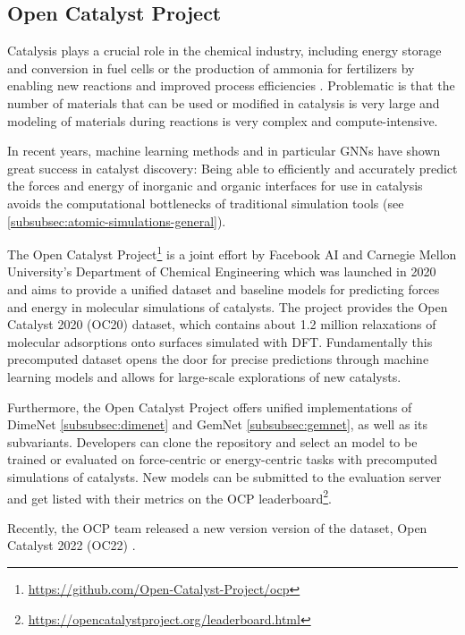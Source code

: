 \subsection{Open Catalyst Project}

Catalysis plays a crucial role in the chemical industry, including energy storage and conversion in 
fuel cells or the production of ammonia for fertilizers by enabling new reactions and improved 
process efficiencies \cite{Chanussot_2021}. Problematic is that the number of materials that can 
be used or modified in catalysis is very large and modeling of materials during reactions is very 
complex and compute-intensive.

In recent years, machine learning methods and in particular GNNs have shown great success in 
catalyst discovery: Being able to efficiently and accurately predict the 
forces and energy of inorganic and organic interfaces for use in catalysis avoids the 
computational bottlenecks of traditional simulation tools (see \ref{subsubsec:atomic-simulations-general}). 

The Open Catalyst Project\footnote{\url{https://github.com/Open-Catalyst-Project/ocp}} \cite*{Chanussot_2021} 
is a joint effort by Facebook AI and Carnegie Mellon University's Department of Chemical Engineering which was 
launched in 2020 and aims to provide a unified dataset and baseline models for predicting forces and energy in 
molecular simulations of catalysts. The project provides the Open Catalyst 2020 (OC20) dataset, which contains 
about 1.2 million relaxations of molecular adsorptions onto surfaces simulated with DFT. Fundamentally this 
precomputed dataset opens the door for precise predictions through machine learning models and allows
for large-scale explorations of new catalysts.

Furthermore, the Open Catalyst Project offers unified implementations of DimeNet \ref{subsubsec:dimenet} and 
GemNet \ref{subsubsec:gemnet}, as well as its subvariants. Developers can clone the repository and select 
an model to be trained or evaluated on force-centric or energy-centric tasks with precomputed simulations of 
catalysts. New models can be submitted to the evaluation server and get listed with their metrics on the OCP 
leaderboard\footnote{\url{https://opencatalystproject.org/leaderboard.html}}.

Recently, the OCP team released a new version version of the dataset, Open Catalyst 2022 (OC22) 
\cite{https://doi.org/10.48550/arxiv.2206.08917}.